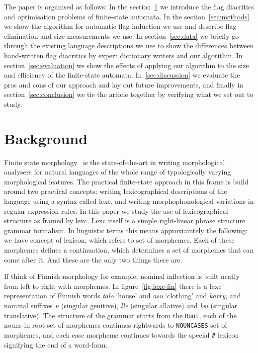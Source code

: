 \documentclass[11pt]{article}
\begin{document}
The paper is organised as follows: In the section~\ref{sec:background} we
introduce the flag diacritics and optimisation problems of finite-state 
automata. In the section~\ref{sec:methods} we show the algorithm for automatic
flag induction we use and describe flag elimination and size measurements we
use. In section~\ref{sec:data} we briefly go through the existing language
descriptions we use to show the differences between hand-written flag
diacritics by expert dictionary writers and our algorithm. In 
section~\ref{sec:evaluation} we show the effects of applying our algorithm
to the size and efficiency of the finite-state automata. In~\ref{sec:discussion}
we evaluate the pros and cons of our approach and lay out future improvements,
and finally in section~\ref{sec:conclusion} we tie the article together by
verifying what we set out to study.

\section{Background}
\label{sec:background}

Finite state morphology~\cite{beesley2003finite} is the state-of-the-art in
writing morphological analysers for natural languages of the whole range of
typologically varying morphological features. The practical finite-state
approach in this frame is build around two practical concepts: writing
lexicographical descriptions of the language using a syntax called lexc, and
writing morphophonological variations in regular expression rules. In this
paper we study the use of lexicographical structure as framed by lexc. Lexc
itself is a simple right-linear phrase structure grammar formalism. In
linguistic terms this means approxiamtely the following: we have concept of
lexicon, which refers to set of morphemes. Each of these morphemes defines a
continuation, which determines a set of morphemes that can come after it. And
these are the only two things there are. 

If think of Finnish morphology for example, nominal inflection is built neatly
from left to right with morphemes. In figure~\ref{fig:lexc-fin} there is a 
lexc representation of Finnish words \emph{talo} `house' and \emph{asu}
`clothing' and \emph{kärry}, and nominal suffixes \emph{n} (singular genitive),
\emph{lle} (singular allative) and \emph{ksi} (singular translative). The
structure of the grammar starts from the \texttt{Root}, each of the nouns in
root set of morphemes continues rightwards to \texttt{NOUNCASES} set of 
morphemes, and each case morpheme continues towards the special \texttt{\#}
lexicon signifying the end of a word-form.
\end{document}
